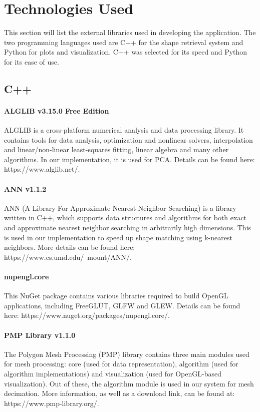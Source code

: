 \documentclass{bigdata}
\begin{document}
\section{Technologies Used}
This section will list the external libraries used in developing the application. The two programming languages used are C++ for the shape retrieval system and Python for plots and visualization. C++ was selected for its speed and Python for its ease of use.
\subsection{C++}
\paragraph{ALGLIB v3.15.0 Free Edition}
ALGLIB is a cross-platform numerical analysis and data processing library. It contains tools for data analysis, optimization and nonlinear solvers, interpolation and linear/non-linear least-squares fitting, linear algebra and many other algorithms. In our implementation, it is used for PCA. Details can be found here: https://www.alglib.net/.
\paragraph{ANN v1.1.2}
ANN (A Library For Approximate Nearest Neighbor Searching) is a library written in C++, which supports data structures and algorithms for both exact and approximate nearest neighbor searching in arbitrarily high dimensions. This is used in our implementation to speed up shape matching using k-nearest neighbors. More details can be found here: https://www.cs.umd.edu/~mount/ANN/.
\paragraph{nupengl.core}
This NuGet package contains various libraries required to build OpenGL applications, including FreeGLUT, GLFW and GLEW. Details can be found here: https://www.nuget.org/packages/nupengl.core/.
\paragraph{PMP Library v1.1.0}
The Polygon Mesh Processing (PMP) library contains three main modules used for mesh processing: core (used for data representation), algorithm (used for algorithm implementations) and visualization (used for OpenGL-based visualization). Out of these, the algorithm module is used in our system for mesh decimation. More information, as well as a download link, can be found at: https://www.pmp-library.org/.
\end{document}
